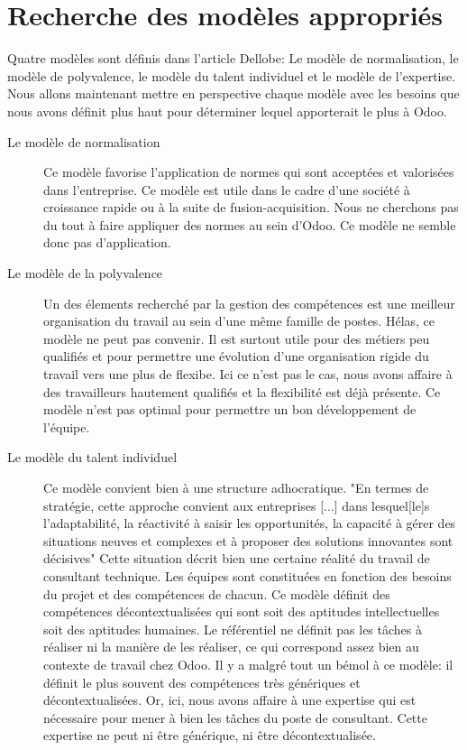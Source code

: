 \section{Recherche des modèles appropriés}
Quatre modèles sont définis dans l'article Dellobe\citep[pp.39-49]{delobbe}: Le modèle de normalisation, le modèle de polyvalence, le modèle du talent individuel et le modèle de l'expertise. Nous allons maintenant mettre en perspective chaque modèle avec les besoins que nous avons définit plus haut pour déterminer lequel apporterait le plus à Odoo.
\begin{description}
  \item[Le modèle de normalisation]
  Ce modèle favorise l'application de normes qui sont acceptées et valorisées dans l'entreprise. Ce modèle est utile dans le cadre d'une société à croissance rapide ou à la suite de fusion-acquisition. Nous ne cherchons pas du tout à faire appliquer des normes au sein d'Odoo. Ce modèle ne semble donc pas d'application. 
  \item[Le modèle de la polyvalence]
  Un des élements recherché par la gestion des compétences est une meilleur organisation du travail au sein d'une même famille de postes. Hélas, ce modèle ne peut pas convenir. Il est surtout utile pour des métiers peu qualifiés et pour permettre une évolution d'une organisation rigide du travail vers une plus de flexibe. Ici ce n'est pas le cas, nous avons affaire à des travailleurs hautement qualifiés et la flexibilité est déjà présente. Ce modèle n'est pas optimal pour permettre un bon développement de l'équipe. 
  \item[Le modèle du talent individuel]
  Ce modèle convient bien à une structure adhocratique. "En termes de stratégie, cette approche convient aux entreprises [...] dans lesquel[le]s l'adaptabilité, la réactivité à saisir les opportunités, la capacité à gérer des situations neuves et complexes et à proposer des solutions innovantes sont décisives"\citep[pp.44]{delobbe} Cette situation décrit bien une certaine réalité du travail de consultant technique. Les équipes sont constituées en fonction des besoins du projet et des compétences de chacun. Ce modèle définit des compétences décontextualisées qui sont soit des aptitudes intellectuelles soit des aptitudes humaines. Le référentiel ne définit pas les tâches à réaliser ni la manière de les réaliser, ce qui correspond assez bien au contexte de travail chez Odoo. Il y a malgré tout un bémol à ce modèle: il définit le plus souvent des compétences très génériques et décontextualisées. Or, ici, nous avons affaire à une expertise qui est nécessaire pour mener à bien les tâches du poste de consultant. Cette expertise ne peut ni être générique, ni être décontextualisée. 

\end{description}
